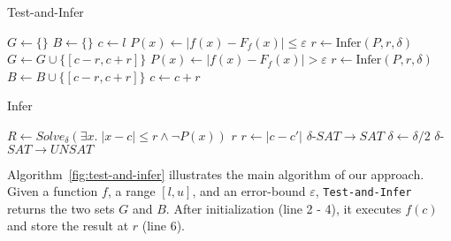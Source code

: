 \begin{algorithm}
  \centering
  \caption{Test-and-Infer}
  \label{fig:test-and-infer}
  \begin{algorithmic}[1]
        \State $G \gets \{\}$
        \State $B \gets \{\}$
        \State $c \gets l$
                \State $P(x) \gets |f(x) - F_f(x)| \le \varepsilon$
                \State $r \gets \mathrm{Infer}(P, r, \delta)$
                \State $G \gets G \cup
                                \{ [c - r, c + r] \}$
            \Else
                \State $P(x) \gets |f(x) - F_f(x)| > \varepsilon$
                \State $r \gets \mathrm{Infer}(P, r, \delta)$
                \State $B \gets B \cup
                                \{ [c - r, c + r] \}$
            \EndIf
            \State $c \gets c + r$
        \EndWhile
    \EndProcedure
  \end{algorithmic}
\end{algorithm}

\begin{algorithm}
  \centering
  \caption{Infer}
  \label{fig:good}
  \begin{algorithmic}[1]
            \State $R \gets Solve_{\delta}(\exists x. \; |x - c| \le r \land \neg P(x))$
                \State \Return $r$
                    \State $r \gets |c - c'|$
                    \Comment $\delta$-$SAT \to SAT$
                \Else
                    \State $\delta \gets \delta / 2$
                    \Comment $\delta$-$SAT \to UNSAT$
                \EndIf
            \EndIf
        \EndWhile
    \EndProcedure
  \end{algorithmic}
\end{algorithm}

Algorithm~\ref{fig:test-and-infer} illustrates the main algorithm of our
approach. Given a function $f$, a range $[l, u]$, and an error-bound
$\varepsilon$, \texttt{Test-and-Infer} returns the two sets $G$ and
$B$. After initialization (line 2 - 4), it executes $f(c)$ and store
the result at $r$ (line 6).

